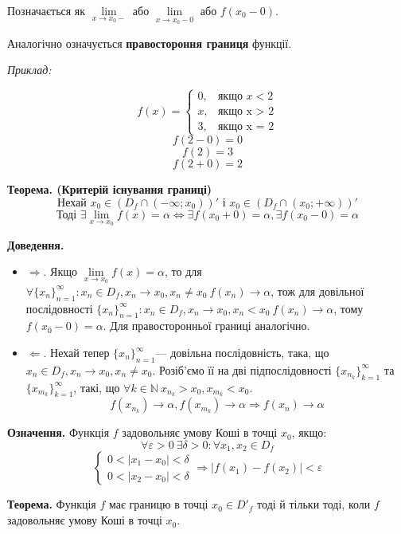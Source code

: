 \documentclass[12pt]{report}
\begin{document}
Позначається як $\lim\limits_{x\to x_0-}$ або $\lim\limits_{x \to x_0-0}$ або $f(x_0 - 0)$.

Аналогічно означується \textbf{правостороння границя} функції.

\textit{Приклад:}

$$f(x) = \begin{cases} 0, & \textrm{якщо } x < 2
\\x, & \textrm{якщо x > 2}
\\3, & \textrm{якщо x = 2}\end{cases}$$
$$f(2-0) = 0$$
$$f(2) = 3$$
$$f(2+0) = 2$$

\textbf{Теорема. (Критерій існування границі)}
$$\textrm{Нехай } x_0 \in (D_f \cap (-\infty; x_0))' \textrm{ і } x_0 \in (D_f \cap (x_0; +\infty))'$$
$$\textrm{Тоді } \exists \lim_{x \to x_0}f(x) = \alpha \Longleftrightarrow \exists f(x_0 + 0) = \alpha, \exists f(x_0 - 0) = \alpha$$

\textbf{Доведення.}
\begin{itemize}
    \item $\Longrightarrow$. Якщо $\lim\limits_{x \to x_0}f(x) = \alpha$, то для $\forall \{ x_n \}_{n=1}^{\infty} : x_n \in D_f, x_n \to x_0, x_n \neq x_0 \  f(x_n) \to \alpha$, тож для довільної послідовності $ \{ x_n \}_{n=1}^{\infty} : x_n \in D_f, x_n \to x_0, x_n < x_0 \  f(x_n) \to \alpha$, тому $f(x_0 - 0) = \alpha$. Для правосторонньої границі аналогічно.
    \item $\Longleftarrow$. Нехай тепер $\{ x_n \}_{n=1}^{\infty}$--- довільна послідовність, така, що $x_n \in D_f, x_n \to x_0, x_n \neq x_0$. Розіб'ємо її на дві підпослідовності $\{ x_{n_k} \}_{k=1}^{\infty}$ та $\{ x_{m_k} \}_{k=1}^{\infty}$, такі, що $\forall k \in \mathbb{N} \ x_{n_k} > x_0, x_{m_k} < x_0$.
    $$f(x_{n_k}) \to \alpha, f(x_{m_k}) \to \alpha \Longrightarrow f(x_n) \to \alpha$$
\end{itemize}

\textbf{Означення.} Функція $f$ задовольняє умову Коші в точці $x_0$, якщо:
$$\forall \varepsilon > 0 \ \exists \delta > 0 : \forall x_1, x_2 \in D_f$$
$$\begin{cases}
   0 < |x_1 - x_0| < \delta \\ 0 < |x_2 - x_0| < \delta
   \end{cases} \Longrightarrow |f(x_1) - f(x_2)| < \varepsilon$$

\vspace{5mm}

\textbf{Теорема.} Функція $f$ має границю в точці $x_0 \in D'_f$ тоді й тільки тоді, коли $f$ задовольняє умову Коші в точці $x_0$.
\end{document}
